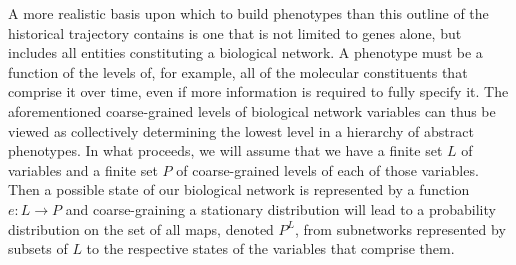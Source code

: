 A more realistic basis upon which to build phenotypes than this outline of the historical trajectory contains is one that is not limited to genes alone, but includes all entities constituting a biological network. A phenotype must be a function of the levels of, for example, all of the molecular constituents that comprise it over time, even if more information is required to fully specify it.  The aforementioned coarse-grained levels of biological network variables can thus be viewed as collectively determining the lowest level in a hierarchy of abstract phenotypes. In what proceeds, we will assume that we have a finite set $L$ of variables and a finite set $P$ of coarse-grained levels of each of those variables.
Then a possible state of our biological network is represented by a function $e : L \to P$ and coarse-graining a stationary distribution will lead to a probability distribution on the set of all maps, denoted $P^L$, from subnetworks represented by subsets of $L$ to the respective states of the variables that comprise them.





